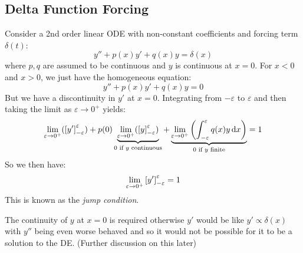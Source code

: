 \documentclass[../main.tex]{subfiles}
\begin{document}
\subsection{Delta Function Forcing}
\label{deltaForcing}
Consider a 2nd order linear ODE with non-constant coefficients and forcing term $\delta(t)$:
\[
  y'' + p(x)y' + q(x)y = \delta(x)
\]
where $p, q$ are assumed to be continuous and $y$ is continuous at $x = 0$.
For $x < 0$ and $x > 0$, we just have the homogeneous equation:
\[
  y'' + p(x)y' + q(x)y = 0
\]
But we have a discontinuity in $y'$ at $x = 0$.
Integrating from $-\varepsilon$ to $\varepsilon$ and then taking the limit as $\varepsilon \to 0^{+}$ yields:
\[
  \lim_{\varepsilon \to 0^{+}} (\eval{y'}{-\varepsilon}{\varepsilon}) + p(0) \underbrace{\lim_{\varepsilon \to 0^{+}} (\eval{y}{-\varepsilon}{\varepsilon})}_{0 \text{ if $y$ continuous}} + \underbrace{\lim_{\varepsilon \to 0^{+}} \left(\int_{-\varepsilon}^{\varepsilon} q(x)y \d{x}\right)}_{0 \text{ if $y$ finite}} = 1
\]
So we then have:
\[
  \lim_{\varepsilon \to 0^{+}} \left[y'\right]_{-\varepsilon}^{\varepsilon} = 1
\]
This is known as the \textit{jump condition}.
\begin{remark}[Note]
  The continuity of $y$ at $x = 0$ is required otherwise $y'$ would be like $y' \propto \delta(x)$ with $y''$ being even worse behaved and so it would not be possible for it to be a solution to the DE.
  (Further discussion on this later)
\end{remark}
\end{document}
